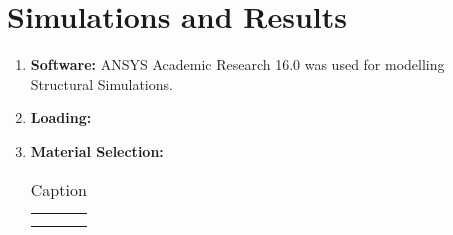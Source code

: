 \documentclass[../../main.tex]{subfiles}
\begin{document}
\section{Simulations and Results}
\begin{enumerate}
    \item \textbf{Software:} ANSYS Academic Research 16.0 was used for modelling Structural Simulations.
    \item \textbf{Loading:} 
    \item \textbf{Material Selection:}
    \begin{table}[]
        \centering
        \begin{tabular}{c|}
             &  \\
             & 
        \end{tabular}
        \caption{Caption}
        \label{tab:my_label}
    \end{table}

\end{enumerate}
\end{document}

